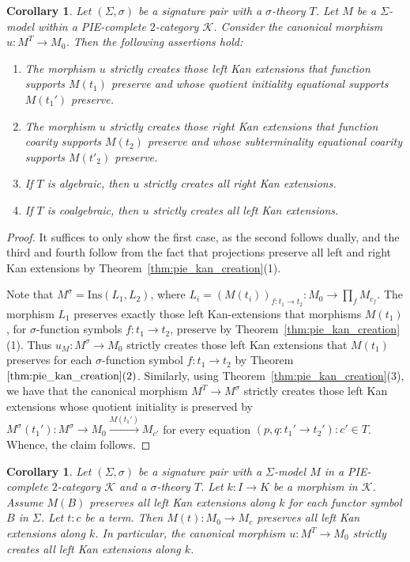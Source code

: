 \documentclass[11pt]{article}
\theoremstyle{plain}
\newtheorem{corollary}[theorem]{Corollary}
\theoremstyle{definition}
\numberwithin{equation}{section}
\newcommand{\K}{\mathcal{K}}
\newcommand{\Ins}{\mathrm{Ins}}
\begin{document}
\begin{corollary}\label{cor:LimitsLiftedToBialgebras}
   Let $(\Sigma,\sigma)$ be a signature pair with a $\sigma$-theory $T$. Let $M$ be a $\Sigma$-model within a PIE-complete $2$-category $\K$. Consider the canonical morphism $u\colon M^T\to M_0$. Then the following assertions hold:
   \begin{enumerate}
       \item The morphism $u$ strictly creates those left Kan extensions that function supports $M(t_1)$ preserve and whose quotient initiality equational supports $M(t_1')$ preserve.
       \item The morphism $u$ strictly creates those right Kan extensions that function coarity supports $M(t_2)$ preserve and whose subterminality equational coarity supports $M(t'_2)$ preserve. 
       \item If $T$ is algebraic, then $u$ strictly creates all right Kan extensions.
       \item If $T$ is coalgebraic, then $u$ strictly creates all left Kan extensions.
   \end{enumerate}
\end{corollary}
\begin{proof}
   It suffices to only show the first case, as the second follows dually, and the third and fourth follow from the fact that projections preserve all left and right Kan extensions by Theorem~\ref{thm:pie_kan_creation}(1).

   Note that $M^\sigma = \Ins(L_1,L_2)$, where $L_i= (M(t_i))_{f\colon t_1\to t_2}\colon M_0\to \prod_f M_{c_f}$. The morphism $L_1$ preserves exactly those left Kan-extensions that morphisms $M(t_1)$, for $\sigma$-function symbols $f\colon t_1\to t_2$, preserve by Theorem~\ref{thm:pie_kan_creation} (1). Thus $u_M\colon M^\sigma\to M_0$ strictly creates those left Kan extensions that $M(t_1)$ preserves for each $\sigma$-function symbol $f\colon t_1\to t_2$ by Theorem $\ref{thm:pie_kan_creation}(2)$. Similarly, using Theorem~\ref{thm:pie_kan_creation}(3), we have that the canonical morphism $M^T\to M^\sigma$ strictly creates those left Kan extensions whose quotient initiality is preserved by $M^\sigma(t_1')\colon M^\sigma\to M_0\xrightarrow{M(t_1')} M_{c'}$ for every equation $(p,q\colon t_1'\to t_2')\colon c'\in T$. Whence, the claim follows.
\end{proof}
\begin{corollary}\label{cor:limitPreservationFromAtomicPreservation}
   Let $(\Sigma,\sigma)$ be a signature pair with a $\Sigma$-model $M$ in a PIE-complete $2$-category $\K$ and a $\sigma$-theory $T$. Let $k\colon I\to K$ be a morphism in $\K$. Assume $M(B)$ preserves all left Kan extensions along $k$ for each functor symbol $B$ in $\Sigma$. Let $t\colon c$ be a term. Then $M(t)\colon M_0\to M_c$ preserves all left Kan extensions along $k$. In particular, the canonical morphism $u\colon M^T\to M_0$ strictly creates all left Kan extensions along $k$.
\end{corollary}
\end{document}
